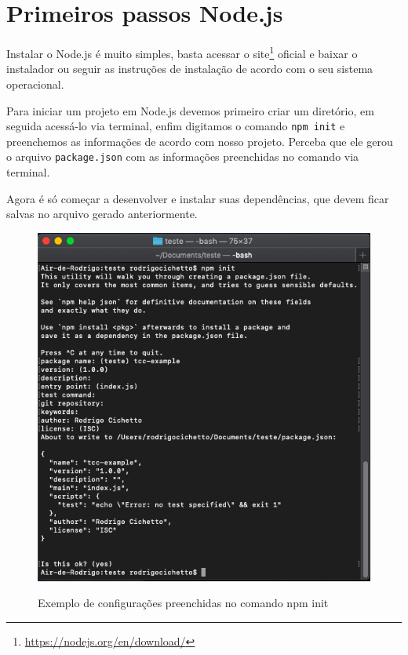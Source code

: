 \documentclass[
	12pt,				%
	openright,			%
	twoside,			%
	a4paper,			%
	english,			%
	brazil				%
	]{abntex2}
\begin{document}
\begin{anexosenv}
\begin{figure}[h]
\end{figure}

\chapter {Primeiros passos Node.js}
\label{anexo:NodePrimeirosPassos}

Instalar o Node.js é muito simples, basta acessar o site\footnote{\url{https://nodejs.org/en/download/}} oficial e baixar o instalador ou seguir as instruções de instalação de acordo com o seu sistema operacional.

Para iniciar um projeto em Node.js devemos primeiro criar um diretório, em seguida acessá-lo via terminal, enfim digitamos o comando \verb|npm init| e preenchemos as informações de acordo com nosso projeto. Perceba que ele gerou o arquivo \verb|package.json| com as informações preenchidas no comando via terminal.

Agora é só começar a desenvolver e instalar suas dependências, que devem ficar salvas no arquivo gerado anteriormente.

\begin{figure}[h]
	\centering

  \caption{Exemplo de configurações preenchidas no comando npm init} \label{fig:NpmInitExample}
    \includegraphics[scale=0.5]{npm-init-example} \\


\end{figure}
\end{anexosenv}
\end{document}
